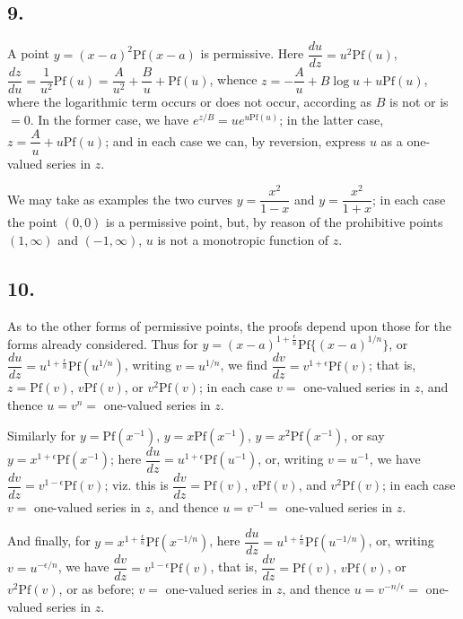 \documentclass[11pt,a4paper]{book}
\providecommand{\Pf}{\mathrm{Pf}}
\begin{document}
\subsection*{9.}

A point $y = (x - a)^2 \Pf(x - a)$ is permissive. Here $\dfrac{du}{dz} = u^2 \Pf(u)$, $\dfrac{dz}{du} = \dfrac{1}{u^2}\Pf(u) = \dfrac{A}{u^2} + \dfrac{B}{u} + \Pf(u)$, whence $z = -\dfrac{A}{u} + B\log u + u\Pf(u)$, where the logarithmic term occurs or does not occur, according as $B$ is not or is $= 0$. In the former case, we have $e^{z/B} = u e^{u\Pf(u)}$; in the latter case, $z = \dfrac{A}{u} + u\Pf(u)$; and in each case we can, by reversion, express $u$ as a one-valued series in $z$.

We may take as examples the two curves $y = \dfrac{x^2}{1 - x}$ and $y = \dfrac{x^2}{1 + x}$; in each case the point $(0, 0)$ is a permissive point, but, by reason of the prohibitive points $(1, \infty)$ and $(-1, \infty)$, $u$ is not a monotropic function of $z$.

\subsection*{10.}

As to the other forms of permissive points, the proofs depend upon those for the forms already considered. Thus for $y = (x - a)^{1 + \frac{\epsilon}{n}} \Pf\{(x - a)^{1/n}\}$, or $\dfrac{du}{dz} = u^{1 + \frac{\epsilon}{n}} \Pf(u^{1/n})$, writing $v = u^{1/n}$, we find $\dfrac{dv}{dz} = v^{1 + \epsilon} \Pf(v)$; that is, $z = \Pf(v)$, $v\Pf(v)$, or $v^2\Pf(v)$; in each case $v =$ one-valued series in $z$, and thence $u = v^n =$ one-valued series in $z$.

Similarly for $y = \Pf(x^{-1})$, $y = x\Pf(x^{-1})$, $y = x^2\Pf(x^{-1})$, or say $y = x^{1 + \epsilon}\Pf(x^{-1})$; here $\dfrac{du}{dz} = u^{1 + \epsilon}\Pf(u^{-1})$, or, writing $v = u^{-1}$, we have $\dfrac{dv}{dz} = v^{1 - \epsilon}\Pf(v)$; viz. this is $\dfrac{dv}{dz} = \Pf(v)$, $v\Pf(v)$, and $v^2\Pf(v)$; in each case $v =$ one-valued series in $z$, and thence $u = v^{-1} =$ one-valued series in $z$.

And finally, for $y = x^{1 + \frac{\epsilon}{n}} \Pf(x^{-1/n})$, here $\dfrac{du}{dz} = u^{1 + \frac{\epsilon}{n}} \Pf(u^{-1/n})$, or, writing $v = u^{-\epsilon/n}$, we have $\dfrac{dv}{dz} = v^{1 - \epsilon}\Pf(v)$, that is, $\dfrac{dv}{dz} = \Pf(v)$, $v\Pf(v)$, or $v^2\Pf(v)$, or as before; $v =$ one-valued series in $z$, and thence $u = v^{-n/\epsilon} =$ one-valued series in $z$.
\end{document}
